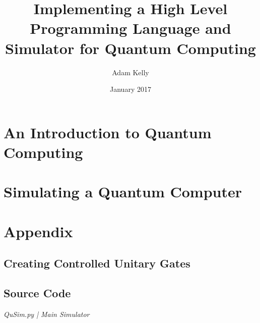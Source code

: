 \documentclass{scrartcl}
\title{Implementing a High Level Programming Language and Simulator for Quantum Computing}
\author{Adam Kelly}
\date{January 2017}
\begin{document}
\begin{titlepage}
\maketitle
\end{titlepage}

\newpage
\tableofcontents
\newpage

\section{An Introduction to Quantum Computing}


\section{Simulating a Quantum Computer}


\newpage
\section{Appendix}
\subsection{Creating Controlled Unitary Gates}


\subsection{Source Code}

\emph{QuSim.py | Main Simulator}


\newpage
\printbibliography
\newpage
\end{document}
